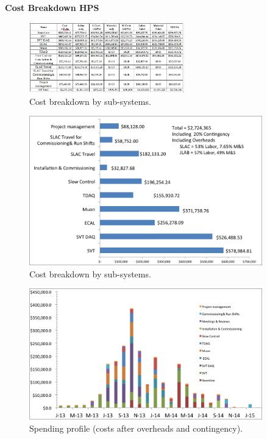 {\bf {\large Cost Breakdown HPS}}

\begin{figure}[h]
\centering
\includegraphics[angle=90,width=0.6\textwidth]{cost_schedule/cost_systems_table.jpg} 
\caption{Cost breakdown by sub-systems.}
\label{fig:cost}
\end{figure}

\begin{figure}[h]
\centering
\includegraphics[width=0.9\textwidth]{cost_schedule/cost_systems.jpg} 
\caption{Cost breakdown by sub-systems.}
\label{fig:cost}
\end{figure}

\begin{figure}[h]
\centering
\includegraphics[width=0.9\textwidth]{cost_schedule/spending.jpg} 
\caption{Spending profile (costs after overheads and contingency).}
\label{fig:spending}
\end{figure}

